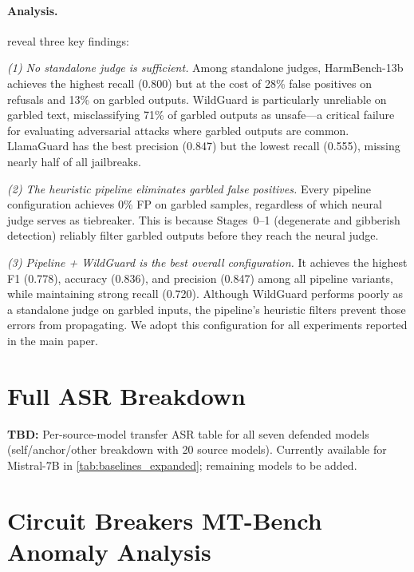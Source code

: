 \paragraph{Analysis.}
 reveal three key findings:


\emph{(1) No standalone judge is sufficient.} Among standalone judges, HarmBench-13b achieves the highest recall (0.800) but at the cost of 28\% false positives on refusals and 13\% on garbled outputs. WildGuard is particularly unreliable on garbled text, misclassifying 71\% of garbled outputs as unsafe---a critical failure for evaluating adversarial attacks where garbled outputs are common. LlamaGuard has the best precision (0.847) but the lowest recall (0.555), missing nearly half of all jailbreaks.

\emph{(2) The heuristic pipeline eliminates garbled false positives.} Every pipeline configuration achieves 0\% FP on garbled samples, regardless of which neural judge serves as tiebreaker. This is because Stages~0--1 (degenerate and gibberish detection) reliably filter garbled outputs before they reach the neural judge.

\emph{(3) Pipeline + WildGuard is the best overall configuration.} It achieves the highest F1 (0.778), accuracy (0.836), and precision (0.847) among all pipeline variants, while maintaining strong recall (0.720). Although WildGuard performs poorly as a standalone judge on garbled inputs, the pipeline's heuristic filters prevent those errors from propagating. We adopt this configuration for all experiments reported in the main paper.

\section{Full ASR Breakdown}
\label{app:full_asr}

\textbf{TBD:} Per-source-model transfer ASR table for all seven defended models (self/anchor/other breakdown with 20 source models). Currently available for Mistral-7B in \cref{tab:baselines_expanded}; remaining models to be added.

\section{Circuit Breakers MT-Bench Anomaly Analysis}
\label{app:cb_mtbench}

